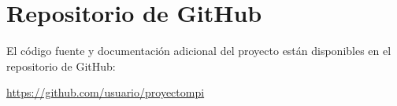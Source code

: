 \documentclass[fleqn,10pt]{article}
\begin{document}
\clearpage
\section*{Repositorio de GitHub}
El código fuente y documentación adicional del proyecto están disponibles en el repositorio de GitHub:

\url{https://github.com/usuario/proyectompi}
\end{document}
